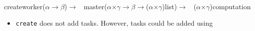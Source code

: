 \documentclass[xcolor=dvipsnames,8pt]{beamer}
\begin{document}
\begin{frame}
{{\begin{minipage}{\textwidth}
\noindent{}\hspace*{1.22ex}create\hspace*{1.22ex}worker\hspace*{1.22ex}(\ensuremath{\alpha}\hspace*{1.22ex}\ensuremath{\rightarrow}\hspace*{1.22ex}\ensuremath{\beta})\hspace*{1.22ex}\ensuremath{\rightarrow}\hspace*{1.22ex}~\linebreak
\noindent\hspace*{7.00em}master(\ensuremath{\alpha}\hspace*{1.22ex}\ensuremath{\times}\hspace*{1.22ex}\ensuremath{\gamma}\hspace*{1.22ex}\ensuremath{\rightarrow}\hspace*{1.22ex}\ensuremath{\beta}\hspace*{1.22ex}\ensuremath{\rightarrow}\hspace*{1.22ex}(\ensuremath{\alpha}\hspace*{1.22ex}\ensuremath{\times}\hspace*{1.22ex}\ensuremath{\gamma})list)\hspace*{1.22ex}\ensuremath{\rightarrow}~\linebreak
\noindent\hspace*{7.00em}(\ensuremath{\alpha}\hspace*{1.22ex}\ensuremath{\times}\hspace*{1.22ex}\ensuremath{\gamma})\hspace*{1.22ex}computation
\end{minipage}}}


\medskip\noindent
  \begin{itemize}
  \item \texttt{create} does not add tasks. However, tasks could be added using
  \end{itemize}
  

\medskip\noindent
{\colorbox{tmpcolor}{\begin{minipage}{\textwidth}\tt\parindent 0pt


\end{minipage}}}
\end{frame}
\end{document}
